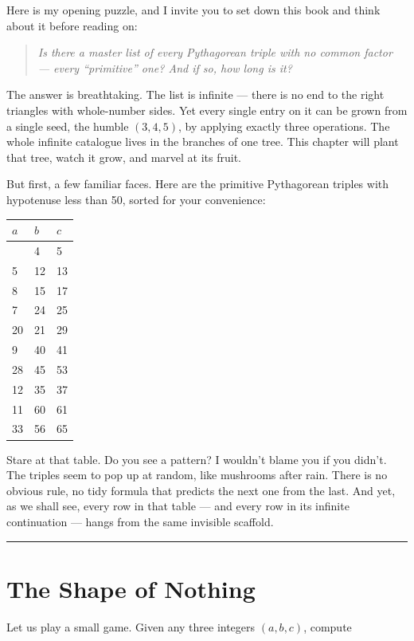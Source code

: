 Here is my opening puzzle, and I invite you to set down this book and think about it before reading on:

\begin{quote}
\emph{Is there a master list of every Pythagorean triple with no common factor --- every ``primitive'' one? And if so, how long is it?}
\end{quote}

The answer is breathtaking. The list is infinite --- there is no end to the right triangles with whole-number sides. Yet every single entry on it can be grown from a single seed, the humble \((3, 4, 5)\), by applying exactly three operations. The whole infinite catalogue lives in the branches of one tree. This chapter will plant that tree, watch it grow, and marvel at its fruit.

But first, a few familiar faces. Here are the primitive Pythagorean triples with hypotenuse less than 50, sorted for your convenience:

\begin{longtable}[]{@{}lll@{}}
\toprule\noalign{}
\(a\) & \(b\) & \(c\) \\
\midrule\noalign{}
\endhead
\bottomrule\noalign{}
\endlastfoot
3 & 4 & 5 \\
5 & 12 & 13 \\
8 & 15 & 17 \\
7 & 24 & 25 \\
20 & 21 & 29 \\
9 & 40 & 41 \\
28 & 45 & 53 \\
12 & 35 & 37 \\
11 & 60 & 61 \\
33 & 56 & 65 \\
\end{longtable}

Stare at that table. Do you see a pattern? I wouldn't blame you if you didn't. The triples seem to pop up at random, like mushrooms after rain. There is no obvious rule, no tidy formula that predicts the next one from the last. And yet, as we shall see, every row in that table --- and every row in its infinite continuation --- hangs from the same invisible scaffold.

\bigskip\noindent\rule{\linewidth}{0.4pt}\bigskip

\section{The Shape of Nothing}
Let us play a small game. Given any three integers \((a, b, c)\), compute

